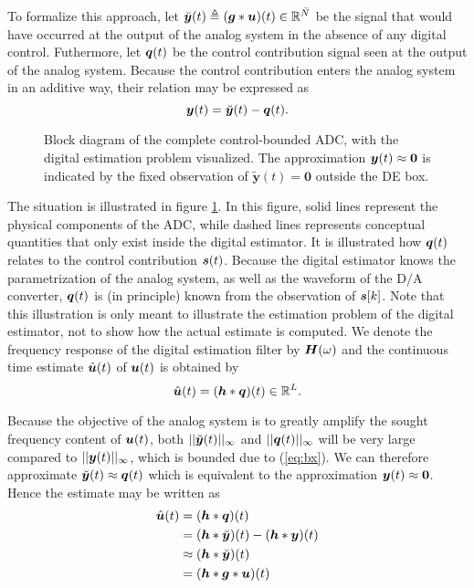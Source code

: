 To formalize this approach, let $\breve{\bm{y}}(t) \triangleq (\bm{g} * \bm{u})(t) \in \mathbb{R}^{\tilde{N}}$ be the signal that would have occurred at the output of the analog system in the absence of any digital control. Futhermore, let $\bm{q}(t)$ be the control contribution signal seen at the output of the analog system. Because the control contribution enters the analog system in an additive way, their relation may be expressed as
\begin{equation}
    \label{eq:actual_observation}
    \bm{y}(t) = \breve{\bm{y}}(t) -\bm{q}(t).
\end{equation}
\begin{sidewaysfigure}
    \centering
    
    \caption{Block diagram of the complete control-bounded ADC, with the digital estimation problem visualized. The approximation $\bm{y}(t) \approx \bm{0}$ is indicated by the fixed observation of $\tilde{\bm{y}}(t) = \bm{0}$ outside the DE box.}
    \label{fig:de_problem}
\end{sidewaysfigure}

The situation is illustrated in figure \ref{fig:de_problem}. In this figure, solid lines represent the physical components of the ADC, while dashed lines represents conceptual quantities that only exist inside the digital estimator. It is illustrated how $\bm{q}(t)$ relates to the control contribution $\bm{s}(t)$. Because the digital estimator knows the parametrization of the analog system, as well as the waveform of the D/A converter, $\bm{q}(t)$ is (in principle) known from the observation of $\bm{s}[k]$. Note that this illustration is only meant to illustrate the estimation problem of the digital estimator, not to show how the actual estimate is computed. We denote the frequency response of the digital estimation filter by $\bm{H}(\omega)$ and the continuous time estimate $\hat{\bm{u}}(t)$ of $\bm{u}(t)$ is obtained by
\begin{equation}
    \label{eq:uhat_conv_h_q}
    \hat{\bm{u}}(t) = (\bm{h} * \bm{q})(t) \in \mathbb{R}^{L}.
\end{equation}

Because the objective of the analog system is to greatly amplify the sought frequency content of $\bm{u}(t)$, both $||\breve{\bm{y}}(t)||_{\infty}$ and $||\bm{q}(t)||_{\infty}$ will be very large compared to $||\bm{y}(t)||_{\infty}$, which is bounded due to (\ref{eq:bx}). We can therefore approximate $\breve{\bm{y}}(t) \approx \bm{q}(t)$ which is equivalent to the approximation $\bm{y}(t) \approx \bm{0}$. Hence the estimate may be written as
\begin{align}
    \hat{\bm{u}}(t) &= (\bm{h} * \bm{q})(t) \\
            &= (\bm{h} * \breve{\bm{y}})(t) - (\bm{h} * \bm{y})(t) \label{eq:uhat_q_err}\\
            &\approx (\bm{h} * \breve{\bm{y}})(t) \label{eq:uhat_approx}\\
            &= (\bm{h} * \bm{g} * \bm{u})(t) \label{eq:uhat_q_err2}
\end{align}

